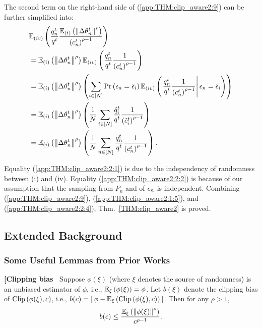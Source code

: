 The second term on the right-hand side of (\ref{app:THM:clip_aware2:9}) can be further simplified into:
\begin{align}
&\mathbb{E}_{(iv)}\left({\frac{q_n^t}{q^t} \frac{\mathbb{E}_{(i)}\left({\left\|{\Delta {\theta}_n^t}{}\right\|^{\rho}}\right)}{\left(c_n^t\right)^{\rho-1}}}\right) \nonumber
\\
&= \mathbb{E}_{(i)}\left({\left\|{\Delta {\theta}_n^t}\right\|^{\rho}}\right)\mathbb{E}_{(iv)}\left({\frac{q_n^t}{q^t} \frac{1}{\left(c_n^t\right)^{\rho-1}}}\right)
\label{app:THM:clip_aware2:2:1}
\\
&= \mathbb{E}_{(i)}\left({\left\|{\Delta {\theta}_n^t}\right\|^{\rho}}\right)\left(\sum_{i\in [N]} \text{Pr}\left({\epsilon}_n=\hat{{\epsilon}}_i\right)\mathbb{E}_{(iv)}\left({\left.\frac{q_n^t}{q^t} \frac{1}{\left(c_n^t\right)^{\rho-1}}\right| {\epsilon}_n=\hat{{\epsilon}}_i}\right)\right)
\label{app:THM:clip_aware2:2:2}
\\
&=\mathbb{E}_{(i)}\left({\left\|{\Delta {\theta}_n^t}\right\|^{\rho}}\right)\left(\frac{1}{N}\sum_{i\in [N]}\frac{\hat{q}_i^t}{q^t} \frac{1}{\left(\hat{c}_i^t\right)^{\rho-1}} \right)
\label{app:THM:clip_aware2:2:3}
\\
&=\mathbb{E}_{(i)}\left({\left\|{\Delta {\theta}_n^t}\right\|^{\rho}}\right)\left(\frac{1}{N}\sum_{n\in [N]}\frac{q_n^t}{q^t} \frac{1}{\left(c_n^t\right)^{\rho-1}} \right).\label{app:THM:clip_aware2:2:4}
\end{align}

Equality (\ref{app:THM:clip_aware2:2:1}) is due to the independency of randomness between (i) and (iv). Equality (\ref{app:THM:clip_aware2:2:2}) is because of our assumption that the sampling from $P_n$ and of ${\epsilon}_n$ is independent. Combining (\ref{app:THM:clip_aware2:9}), (\ref{app:THM:clip_aware2:1:5}), and (\ref{app:THM:clip_aware2:2:4}), Thm.~\ref{THM:clip_aware2} is proved.


\subsection{%
{Extended Background}}
\subsubsection{Some Useful Lemmas  from Prior Works}\label{app:prior:lemma}

\begin{lem}\label{app:prior:clipbias}
\textbf{[Clipping bias~\citep{das2023beyond}} Suppose $\phi(\xi)$ (where $\xi$ denotes the source of randomness) is an unbiased estimator of $\phi$, i.e., $\mathbb{E}_{\xi}\left({\phi(\xi)}\right)=\phi$. Let $b(\xi)$ denote the clipping bias of $\text{Clip}\left(\phi(\xi), c\right)$, i.e., $b(c)=\left\|\phi - \mathbb{E}_{\xi}\left({\text{Clip}\left(\phi(\xi), c\right)}\right) \right\|$.
Then for any $\rho>1$,
\begin{align}
    b(c)\leq \frac{\mathbb{E}_{\xi}\left({\left\|\phi(\xi) \right\|^{\rho}}\right)}{c^{\rho-1}}.
\end{align}
\end{lem}


